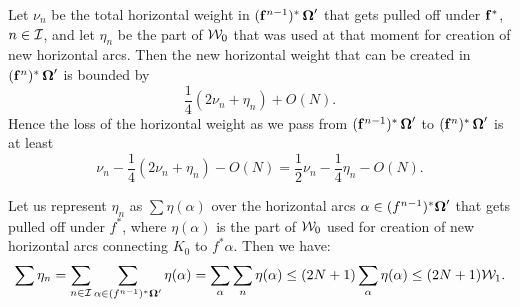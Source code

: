 Let $\nu_n$ be the total horizontal  weight in $({\mathbf{f}}^{n-1})^*\, {\boldsymbol{{\Omega}}}'$ that gets pulled off under ${\mathbf{f}}^*$, $n\in {\mathcal I}$,
and let $\eta_n$ be the part of ${\mathcal W}_0$ that was used at that moment  for creation
of new horizontal arcs. %
Then the new horizontal weight that can be created in  $({\mathbf{f}}^n)^*\, {\boldsymbol{{\Omega}}}' $ is bounded by 
\begin{equation}\label{bound on nu}
    \frac 14 (2\nu_n  + \eta_n) +O(N). 
\end{equation}
Hence the loss of the horizontal weight as we pass from   $({\mathbf{f}}^{n-1})^*\, {\boldsymbol{{\Omega}}}'$ to  $({\mathbf{f}}^n)^*\, {\boldsymbol{{\Omega}}}'$ is at least
\begin{equation}\label{loss at one step}
    \nu_n  -  \frac 14 (2\nu_n +  \eta_n ) - O(N) = \frac 12 \nu_n - \frac 14 \eta_n  - O(N). 
  \end{equation}\label{nu-prime}

  Let us represent $\eta_n$ as $\sum \eta(\alpha)$
 over the horizontal arcs $\alpha\in (f^{n-1})^* {\boldsymbol{{\Omega}}}'  $ that gets
pulled off under $f^*$,
where $\eta (\alpha)$ is the part of ${\mathcal W}_0$ used for creation of
new horizontal arcs connecting $K_0$ to $f^*\alpha$.
Then we have:
\begin{equation}\label{penalty} 
  \sum \eta_n  = \sum_{n\in {\mathcal I}}  \sum_{\alpha\in (f^{n-1})^*{\boldsymbol{{\Omega}}}'}  \eta (\alpha) =
  \sum_\alpha\sum_n  \eta (\alpha) \leq  (2N+1) \sum_\alpha\eta(\alpha) 
  \leq (2N+1) {\mathcal W}_1. 
\end{equation}  

